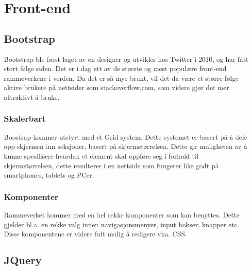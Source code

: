 \section{Front-end}
\subsection{Bootstrap}
Bootstrap ble først laget av en designer og utvikler hos Twitter i 2010, og har fått stort følge siden. Det er i dag ett av de største og mest populære front-end rammeverkene i verden. Da det er så mye brukt, vil det da være et større følge aktive brukere på nettsider som stackoverflow.com, som videre gjør det mer attraktivt å bruke.

\subsubsection*{Skalerbart}
Boostrap kommer utstyrt med et Grid system. Dette systemet er basert på å dele opp skjermen inn seksjoner, basert på skjermstørrelsen. Dette gir muligheten av å kunne spesifisere hvordan et element skal oppføre seg i forhold til skjermstørrelsen, dette resulterer i en nettside som fungerer like godt på smartphones, tablets og PCer.

\subsubsection*{Komponenter}
Rammeverket kommer med en hel rekke komponenter som kan benyttes.  Dette gjelder bl.a. en rekke valg innen navigasjonsmenyer, input bokser, knapper etc. Disse komponentene er videre fult mulig å redigere vha. CSS.


\subsection{JQuery}


